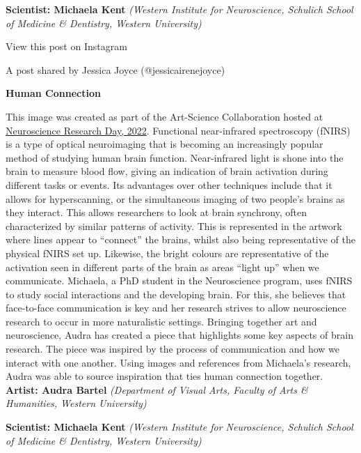 \documentclass[
]{article}
\begin{document}
\textbf{Scientist: Michaela Kent} \emph{(Western Institute for
Neuroscience, Schulich School of Medicine \& Dentistry, Western
University)}

View this post on Instagram

A post shared by Jessica Joyce (@jessicairenejoyce)

\textbf{Human Connection}

This image was created as part of the Art-Science Collaboration hosted
at \href{https://songsuwo.ca/nrd2022}{Neuroscience Research Day, 2022}.
Functional near-infrared spectroscopy (fNIRS) is a type of optical
neuroimaging that is becoming an increasingly popular method of studying
human brain function. Near-infrared light is shone into the brain to
measure blood flow, giving an indication of brain activation during
different tasks or events. Its advantages over other techniques include
that it allows for hyperscanning, or the simultaneous imaging of two
people's brains as they interact. This allows researchers to look at
brain synchrony, often characterized by similar patterns of activity.
This is represented in the artwork where lines appear to ``connect'' the
brains, whilst also being representative of the physical fNIRS set up.
Likewise, the bright colours are representative of the activation seen
in different parts of the brain as areas ``light up'' when we
communicate. Michaela, a PhD student in the Neuroscience program, uses
fNIRS to study social interactions and the developing brain. For this,
she believes that face-to-face communication is key and her research
strives to allow neuroscience research to occur in more naturalistic
settings. Bringing together art and neuroscience, Audra has created a
piece that highlights some key aspects of brain research. The piece was
inspired by the process of communication and how we interact with one
another. Using images and references from Michaela's research, Audra was
able to source inspiration that ties human connection together.
\textbf{Artist: Audra Bartel} \emph{(Department of Visual Arts, Faculty
of Arts \& Humanities, Western University)}

\textbf{Scientist: Michaela Kent} \emph{(Western Institute for
Neuroscience, Schulich School of Medicine \& Dentistry, Western
University)}
\end{document}
